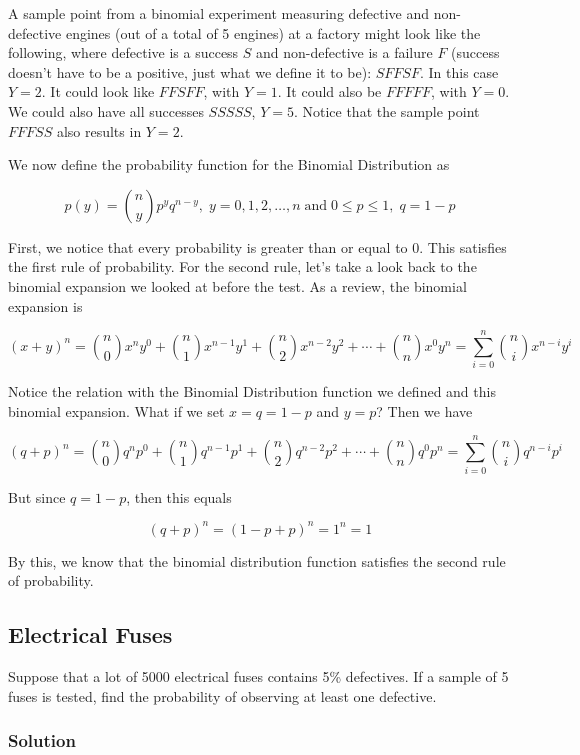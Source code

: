 \documentclass[11pt]{article}
\theoremstyle{definition}
\begin{document}
A sample point from a binomial experiment measuring defective and non-defective engines (out of a total of 5 engines) at a factory might look like the following, where defective is a success $S$ and non-defective is a failure $F$ (success doesn't have to be a positive, just what we define it to be): $SFFSF$. In this case $Y=2$. It could look like $FFSFF$, with $Y=1$. It could also be $FFFFF$, with $Y=0$. We could also have all successes $SSSSS$, $Y=5$. Notice that the sample point $FFFSS$ also results in $Y=2$.

We now define the probability function for the Binomial Distribution as

$$
	p(y) = {n \choose y} p^y q^{n-y}, \; y = 0,1,2,\ldots,n \; \text{and} \; 0 \leq p \leq 1, \; q = 1-p
$$

First, we notice that every probability is greater than or equal to 0. This satisfies the first rule of probability. For the second rule, let's take a look back to the binomial expansion we looked at before the test. As a review, the binomial expansion is

$$
	(x + y)^n = {n \choose 0} x^n y^0 + {n \choose 1} x^{n-1}y^1 + {n \choose 2} x^{n-2}y^2 + \cdots + {n \choose n} x^0 y^n = \sum_{i=0}^n {n \choose i} x^{n-i}y^i
$$

Notice the relation with the Binomial Distribution function we defined and this binomial expansion. What if we set $x=q=1-p$ and $y=p$? Then we have

$$
	(q + p)^n = {n \choose 0} q^n p^0 + {n \choose 1} q^{n-1}p^1 + {n \choose 2} q^{n-2}p^2 + \cdots + {n \choose n} q^0 p^n = \sum_{i=0}^n {n \choose i} q^{n-i}p^i
$$

But since $q = 1-p$, then this equals

$$
	(q + p)^n = (1 - p + p)^n = 1^n = 1
$$

By this, we know that the binomial distribution function satisfies the second rule of probability.

\subsection{Electrical Fuses}

Suppose that a lot of 5000 electrical fuses contains 5\% defectives. If a sample of 5 fuses is tested, find the probability of observing at least one defective.

\subsubsection*{Solution}
\end{document}
